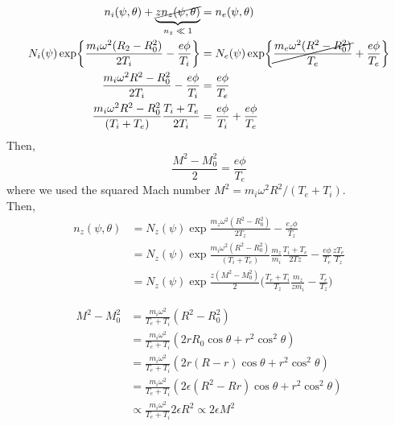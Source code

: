 \begin{equation}
\begin{split}
    n_i(\psi,\theta)+\underbrace{\cancel{zn_z(\psi,\theta)}}_{\text{$n_z \ll 1$}}&=n_e(\psi,\theta) \\
    N_i(\psi)\exp{\frac{m_i\omega^2(R_2-R_0^2)}{2T_i}-\frac{e\phi}{T_i}} &= N_e(\psi)\exp{\cancel{\frac{m_e\omega^2(R^2-R_0^2)}{T_e}}+\frac{e\phi}{T_e}} \\
    \frac{m_i\omega^2R^2-R_0^2}{2T_i}-\frac{e\phi}{T_i}&=\frac{e\phi}{T_e} \\
    \frac{m_i\omega^2R^2-R_0^2}{(T_i+T_e)}\frac{T_i+T_e}{2T_i}&= \frac{e\phi}{T_i}+\frac{e\phi}{T_e} \\
\end{split}
\end{equation}
Then,
\begin{equation}
    \boxed{\frac{M^2-M_0^2}{2}=\frac{e\phi}{T_e}}
\end{equation}
where we used the squared Mach number $M^2 = m_i\omega^2R^2/(T_e+T_i)$. \\
Then,
\begin{equation}
\begin{split}
    n_z(\psi, \theta) &= N_z(\psi)\exp{\frac{m_z\omega^2(R^2-R_0^2)}{2T_z}-\frac{e_z\phi}{T_z}} \\
    &= N_z(\psi)\exp{\frac{m_i\omega^2(R^2-R_0^2)}{(T_i+T_e)}\frac{m_z}{m_i}\frac{T_i+T_e}{2Tz}-\frac{e\phi}{T_e}\frac{zT_e}{T_z}} \\
    &= N_z(\psi)\exp{\frac{z(M^2-M_0^2)}{2}\Big(\frac{T_e+T_i}{T_z}\frac{m_z}{zm_i}-\frac{T_e}{T_z}\Big)}
\end{split}
\end{equation}

\begin{equation}
\begin{split}
    M^2-M_0^2 &= \frac{m_i\omega^2}{T_e+T_i}(R^2-R_0^2) \\
    &=\frac{m_i\omega^2}{T_e+T_i}(2rR_0\cos\theta + r^2\cos^2\theta) \\
    &= \frac{m_i\omega^2}{T_e+T_i}(2r(R-r)\cos\theta + r^2\cos^2\theta) \\
    &=\frac{m_i\omega^2}{T_e+T_i}(2\epsilon(R^2-Rr)\cos\theta+r^2\cos^2\theta) \\
    &\propto \frac{m_i\omega^2}{T_e+T_i}2\epsilon R^2 \propto 2\epsilon M^2 
\end{split}
\end{equation}

\iffalse
Using the relation $R=R_0 + r\cos\theta$ and the inverse aspect ratio $\epsilon=r/R$. 
The first-order drift kinetic equation
\begin{equation}
    v_\parallel\nabla_\parallel\Bigg(f_{a1}+\frac{Iv_\parallel}{\Omega_a}\frac{\partial f_{a0}}{\partial \psi}\Bigg) - \frac{e_av_\parallel E_\parallel}{T_a}f_{a0}=\mathcal{C}_a(f_{a1})
\end{equation}
\fi




